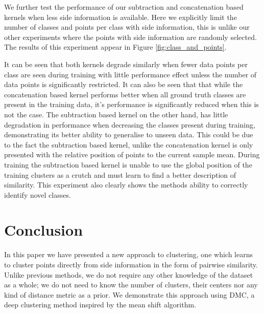 \documentclass[letterpaper, 11pt]{IEEEtran}
\begin{document}
We further test the performance of our subtraction and concatenation based kernels when less side information is available. 
Here we explicitly limit the number of classes and points per class with side information, this is unlike our other experiments where the points with side information are randomly selected.
The results of this experiment appear in Figure \ref{fig:class_and_points}. 

It can be seen that both kernels degrade similarly when fewer data points per class are seen during training with little performance effect unless the number of data points is significantly restricted. It can also be seen that that while the concatenation based kernel performs better when all ground truth classes are present in the training data, it's performance is significantly reduced when this is not the case.
The subtraction based kernel on the other hand, has little degradation in performance when decreasing the classes present during training, demonstrating its better ability to generalise to unseen data.
This could be due to the fact the subtraction based kernel, unlike the concatenation kernel is only presented with the relative position of points to the current sample mean. During training the subtraction based kernel is unable to use the global position of the training clusters as a crutch and must learn to find a better description of similarity.  This experiment also clearly shows the methods ability to correctly identify novel classes.

\section{Conclusion}\label{conclusion}
In this paper we have presented a new approach to clustering, one which learns to cluster points directly from side information in the form of pairwise similarity. Unlike previous methods, we do not require any other knowledge of the dataset as a whole; we do not need to know the number of clusters, their centers nor any kind of distance metric as a prior.
We demonstrate this approach using DMC, a deep clustering method inspired by the mean shift algorithm. 
\end{document}
